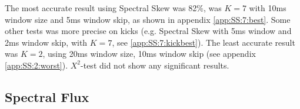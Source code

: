 		

		The most accurate result using Spectral Skew was 82\%, was $K=7$ with 10ms window size and 5ms window skip, as shown in appendix \ref{app:SS:7:best}. Some other tests was more precise on kicks (e.g. Spectral Skew with 5ms window and 2ms window skip, with $K=7$, see \ref{app:SS:7:kickbest}). The least accurate result was $K=2$, using 20ms window size, 10ms window skip (see appendix \ref{app:SS:2:worst}). $X^2$-test did not show any significant results.
	
	\subsection{Spectral Flux}
		
